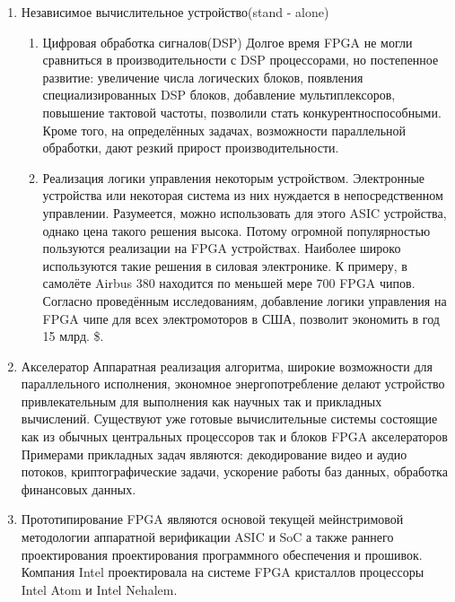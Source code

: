 \begin{enumerate}
  \item Независимое вычислительное устройство(stand - alone)
  		\begin{enumerate}
  		  \item Цифровая обработка сигналов(DSP)
  		  		Долгое время FPGA не могли сравниться в производительности с DSP
  		  		процессорами, но постепенное развитие: увеличение числа логических
  		  		блоков, появления специализированных DSP блоков, добавление
  		  		мультиплексоров, повышение тактовой частоты, позволили стать
  		  		конкурентноспособными. Кроме того, на определённых задачах, возможности
  		  		параллельной обработки, дают резкий прирост производительности.

  		  \item Реализация логики управления некоторым устройством.
  		  		Электронные устройства или некоторая система из них нуждается в
  		  		непосредственном управлении. Разумеется, можно использовать для этого
  		  		ASIC устройства, однако цена такого решения высока. Потому огромной
  		  		популярностью пользуются реализации на FPGA устройствах. 
  		  		Наиболее широко используются такие решения в силовая
  		  		электронике. К примеру, в самолёте Airbus 380 находится
  		  		по меньшей мере 700 FPGA чипов. Согласно проведённым исследованиям,
  				добавление логики управления на FPGA чипе для всех электромоторов в США,
  				позволит экономить в год 15 млрд. \$.
  		\end{enumerate}
  \item Акселератор
  		Аппаратная реализация алгоритма, широкие возможности для параллельного
  		исполнения, экономное энергопотребление делают устройство привлекательным
  		для выполнения как научных так и прикладных вычислений. Существуют уже
  		готовые вычислительные системы состоящие как из обычных центральных
  		процессоров так и блоков FPGA акселераторов Примерами прикладных задач
  		являются: декодирование видео и аудио потоков, криптографические задачи,
  		ускорение работы баз данных, обработка финансовых данных.
  \item Прототипирование
    	FPGA являются основой текущей мейнстримовой методологии аппаратной
  		верификации ASIC и SoC а также раннего проектирования проектирования
  		программного обеспечения и прошивок. Компания Intel проектировала на системе
  		FPGA кристаллов процессоры Intel Atom и Intel Nehalem. 
\end{enumerate}

